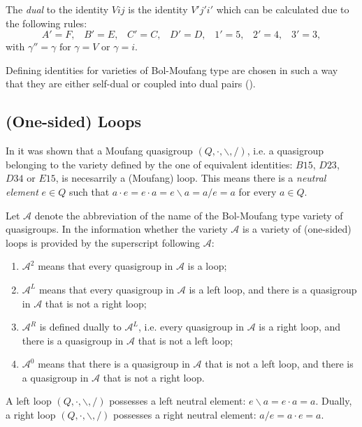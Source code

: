 \documentclass[11pt]{amsart}
\theoremstyle{definition}
\begin{document}
The \emph{dual} to the identity $Vij$ is the identity $V'j'i'$ which can be calculated due to the following rules:
\begin{equation*}
A'=F,\;\;\;B'=E,\;\;\;C'=C,\;\;\;D'=D,\;\;\;1'=5,\;\;\;2'=4,\;\;\;3'=3,
\end{equation*}
with $\gamma''=\gamma \text{ for } \gamma=V \text{ or } \gamma=i$.

Defining identities for varieties of Bol-Moufang type are chosen in such a way that they are either self-dual or coupled into dual pairs (\cite[Table 1]{PhVo1}).

\subsection{(One-sided) Loops} 

In \cite{Kun} it was shown that a Moufang quasigroup $(Q,\cdot,\backslash,/)$, i.e. a quasigroup belonging to the variety defined by the one of equivalent identities: $B15$, $D23$, $D34$ or $E15$, is necesarrily a (Moufang) loop. This means there is a \emph{neutral element} $e\in Q$ such that $a\cdot e=e\cdot a=e\backslash a=a/e=a$ for every $a\in Q$.

Let $\mathcal{A}$ denote the abbreviation of the name of the Bol-Moufang type variety of quasigroups. In \cite{PhVo1} the information whether the variety $\mathcal{A}$ is a variety of (one-sided) loops is provided by the superscript following $\mathcal{A}$:
\begin{enumerate}
\item $\mathcal{A}^2$ means that every quasigroup in $\mathcal{A}$ is a loop;
\item $\mathcal{A}^L$ means that every quasigroup in $\mathcal{A}$ is a left loop, and there is a quasigroup in $\mathcal{A}$ that is not a right loop;
\item $\mathcal{A}^R$ is defined dually to $\mathcal{A}^L$, i.e. every quasigroup in $\mathcal{A}$ is a right loop, and there is a quasigroup in $\mathcal{A}$ that is not a left loop;
\item $\mathcal{A}^0$ means that there is a quasigroup in $\mathcal{A}$ that is not a left loop, and there is a quasigroup in $\mathcal{A}$ that is not a right loop.
\end{enumerate}
A left loop $(Q,\cdot,\backslash,/)$ possesses a left neutral element: $e\backslash a=e\cdot a=a$. Dually, a right loop $(Q,\cdot,\backslash,/)$ possesses a right neutral element: $a/e=a\cdot e=a$.
\end{document}
